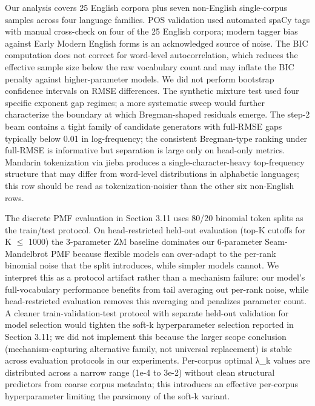 \documentclass[11pt]{article}
\begin{document}
Our analysis covers 25 English corpora plus seven non-English single-corpus samples across four language families. POS validation used automated spaCy tags with manual cross-check on four of the 25 English corpora; modern tagger bias against Early Modern English forms is an acknowledged source of noise. The BIC computation does not correct for word-level autocorrelation, which reduces the effective sample size below the raw vocabulary count and may inflate the BIC penalty against higher-parameter models. We did not perform bootstrap confidence intervals on RMSE differences. The synthetic mixture test used four specific exponent gap regimes; a more systematic sweep would further characterize the boundary at which Bregman-shaped residuals emerge. The step-2 beam contains a tight family of candidate generators with full-RMSE gaps typically below 0.01 in log-frequency; the consistent Bregman-type ranking under full-RMSE is informative but separation is large only on head-only metrics. Mandarin tokenization via jieba produces a single-character-heavy top-frequency structure that may differ from word-level distributions in alphabetic languages; this row should be read as tokenization-noisier than the other six non-English rows.

The discrete PMF evaluation in Section 3.11 uses 80/20 binomial token splits as the train/test protocol. On head-restricted held-out evaluation (top-K cutoffs for K $\leq$ 1000) the 3-parameter ZM baseline dominates our 6-parameter Seam-Mandelbrot PMF because flexible models can over-adapt to the per-rank binomial noise that the split introduces, while simpler models cannot. We interpret this as a protocol artifact rather than a mechanism failure: our model's full-vocabulary performance benefits from tail averaging out per-rank noise, while head-restricted evaluation removes this averaging and penalizes parameter count. A cleaner train-validation-test protocol with separate held-out validation for model selection would tighten the soft-k hyperparameter selection reported in Section 3.11; we did not implement this because the larger scope conclusion (mechanism-capturing alternative family, not universal replacement) is stable across evaluation protocols in our experiments. Per-corpus optimal λ\_k values are distributed across a narrow range (1e-4 to 3e-2) without clean structural predictors from coarse corpus metadata; this introduces an effective per-corpus hyperparameter limiting the parsimony of the soft-k variant.
\end{document}
